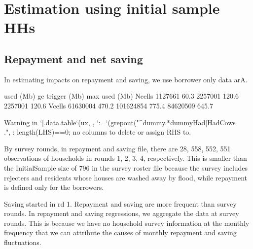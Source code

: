 \section{Estimation using initial sample HHs}


\subsection{Repayment and net saving}

In estimating impacts on repayment and saving, we use borrower only data \textsf{arA}.

\begin{Schunk}
\begin{Soutput}
           used  (Mb) gc trigger  (Mb) max used  (Mb)
Ncells  1127661  60.3    2257001 120.6  2257001 120.6
Vcells 61630004 470.2  101624854 775.4 84620509 645.7
\end{Soutput}
\begin{Soutput}
Warning in `[.data.table`(ux, , `:=`(grepout("^dummy.*dummyHad|HadCows\\.", : length(LHS)==0; no columns to delete or assign RHS to.
\end{Soutput}
\end{Schunk}
By survey rounds, in repayment and saving file, there are 28, 558, 552, 551 observations of households in rounds 1, 2, 3, 4, respectively. This is smaller than the \textsf{InitialSample} size of 796 in the survey roster file because the survey includes rejecters and residents whose houses are washed away by flood, while repayment is defined only for the borrowers.

Saving started in rd 1. Repayment and saving are more frequent than survey rounds. In repayment and saving regressions, we aggregate the data at survey rounds. This is because we have no household survey information at the monthly frequency that we can attribute the causes of monthly repayment and saving fluctuations.

